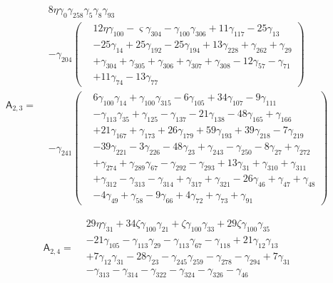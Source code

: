 \[\mathsf A_{2,3}=\begin{aligned}& 8 \eta  \gamma_{0} \gamma_{258} \gamma_{5} \gamma_{8} \gamma_{93}\\&- \gamma_{204} \left(\begin{aligned}& 12 \eta  \gamma_{100}- \varsigma  \gamma_{304}- \gamma_{100} \gamma_{306}+ 11 \gamma_{117}- 25 \gamma_{13}\\&- 25 \gamma_{14}+ 25 \gamma_{192}- 25 \gamma_{194}+ 13 \gamma_{228}+ \gamma_{262}+ \gamma_{29}\\&+ \gamma_{304}+ \gamma_{305}+ \gamma_{306}+ \gamma_{307}+ \gamma_{308}- 12 \gamma_{57}- \gamma_{71}\\&+ 11 \gamma_{74}- 13 \gamma_{77}\end{aligned}\right)\\&- \gamma_{241} \left(\begin{aligned}& 6 \gamma_{100} \gamma_{14}+ \gamma_{100} \gamma_{315}- 6 \gamma_{105}+ 34 \gamma_{107}- 9 \gamma_{111}\\&- \gamma_{113} \gamma_{35}+ \gamma_{125}- \gamma_{137}- 21 \gamma_{138}- 48 \gamma_{165}+ \gamma_{166}\\&+ 21 \gamma_{167}+ \gamma_{173}+ 26 \gamma_{179}+ 59 \gamma_{193}+ 39 \gamma_{218}- 7 \gamma_{219}\\&- 39 \gamma_{221}- 3 \gamma_{226}- 48 \gamma_{23}+ \gamma_{243}- \gamma_{250}- 8 \gamma_{27}+ \gamma_{272}\\&+ \gamma_{274}+ \gamma_{289} \gamma_{67}- \gamma_{292}- \gamma_{293}+ 13 \gamma_{31}+ \gamma_{310}+ \gamma_{311}\\&+ \gamma_{312}- \gamma_{313}- \gamma_{314}+ \gamma_{317}+ \gamma_{321}- 26 \gamma_{46}+ \gamma_{47}+ \gamma_{48}\\&- 4 \gamma_{49}+ \gamma_{58}- 9 \gamma_{66}+ 4 \gamma_{72}+ \gamma_{73}+ \gamma_{91}\end{aligned}\right)\end{aligned}\]

\[\mathsf A_{2,4}=\begin{aligned}& 29 \eta  \gamma_{31}+ 34 \zeta  \gamma_{100} \gamma_{21}+ \zeta  \gamma_{100} \gamma_{33}+ 29 \zeta  \gamma_{100} \gamma_{35}\\&- 21 \gamma_{105}- \gamma_{113} \gamma_{29}- \gamma_{113} \gamma_{67}- \gamma_{118}+ 21 \gamma_{12} \gamma_{13}\\&+ 7 \gamma_{12} \gamma_{31}- 28 \gamma_{23}- \gamma_{245} \gamma_{259}- \gamma_{278}- \gamma_{294}+ 7 \gamma_{31}\\&- \gamma_{313}- \gamma_{314}- \gamma_{322}- \gamma_{324}- \gamma_{326}- \gamma_{46}\end{aligned}\]

